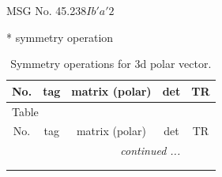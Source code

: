 \documentclass[fleqn,8pt]{jsarticle}
\begin{document}
\setcounter{MaxMatrixCols}{32}

\renewcommand{\tablename}{Table~}
\renewcommand{\figurename}{Figure~}
\begin{center}
\LARGE
MSG No. 45.238\quad$Ib'a'2$
\end{center}
* symmetry operation
\renewcommand{\arraystretch}{1.3}
\begin{longtable}{ccccc}
\caption{Symmetry operations for 3d polar vector.}
 \\
 \hline \hline
No. & tag & matrix (polar) & det & TR \\ \hline \endfirsthead

\multicolumn{4}{l}{\tablename\ \thetable{}} \\
 \hline \hline
No. & tag & matrix (polar) & det & TR \\ \hline \endhead

 \hline \hline
\multicolumn{4}{r}{\footnotesize\it continued ...} \\ \endfoot

 \hline \hline
\multicolumn{4}{r}{} \\ \endlastfoot


\end{longtable}
\end{document}
